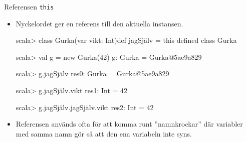 \begin{Slide}{Referensen \texttt{this}}\SlideFontSmall
\begin{itemize}
\item Nyckelordet  ger en referens till den aktuella instansen.
\begin{REPLnonum}
scala> class Gurka(var vikt: Int){def jagSjälv = this}
defined class Gurka

scala> val g = new Gurka(42)
g: Gurka = Gurka@5ae9a829

scala> g.jagSjälv
res0: Gurka = Gurka@5ae9a829

scala> g.jagSjälv.vikt
res1: Int = 42

scala> g.jagSjälv.jagSjälv.vikt
res2: Int = 42
\end{REPLnonum}
\item Referensen  används ofta för att komma runt ''namnkrockar'' där variabler med samma namn gör så att den ena variabeln inte syns.
\end{itemize}
\end{Slide}




